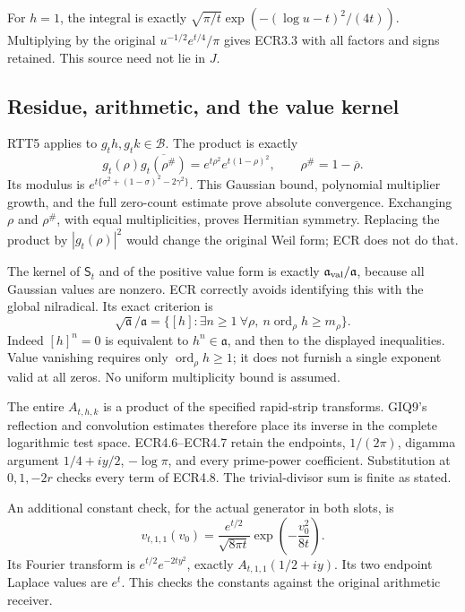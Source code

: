 For \(h=1\), the integral is exactly
\(\sqrt{\pi/t}\exp(-(\log u-t)^2/(4t))\). Multiplying by the original
\(u^{-1/2}e^{t/4}/\pi\) gives ECR3.3 with all factors and signs
retained. This source need not lie in \(J\).

\subsection{Residue, arithmetic, and the value
kernel}\label{residue-arithmetic-and-the-value-kernel}

RTT5 applies to \(g_th,g_tk\in\mathcal B\). The product is exactly \[
g_t(\rho)\overline{g_t(\rho^\#)}
=e^{t\rho^2}e^{t(1-\rho)^2},
\qquad \rho^\#=1-\overline\rho.
\tag{ECRA3}
\] Its modulus is \(e^{t\{\sigma^2+(1-\sigma)^2-2\gamma^2\}}\). This
Gaussian bound, polynomial multiplier growth, and the full zero-count
estimate prove absolute convergence. Exchanging \(\rho\) and
\(\rho^\#\), with equal multiplicities, proves Hermitian symmetry.
Replacing the product by \(|g_t(\rho)|^2\) would change the original
Weil form; ECR does not do that.

The kernel of \(\mathsf S_t\) and of the positive value form is exactly
\(\mathfrak a_{\rm val}/\mathfrak a\), because all Gaussian values are
nonzero. ECR correctly avoids identifying this with the global
nilradical. Its exact criterion is \[
\sqrt{\mathfrak a}/\mathfrak a
=\{[h]:\exists n\ge1\ \forall\rho,\
 n\operatorname{ord}_{\rho}h\ge m_\rho\}.
\tag{ECRA4}
\] Indeed \([h]^n=0\) is equivalent to \(h^n\in\mathfrak a\), and then
to the displayed inequalities. Value vanishing requires only
\(\operatorname{ord}_{\rho}h\ge1\); it does not furnish a single
exponent valid at all zeros. No uniform multiplicity bound is assumed.

The entire \(A_{t,h,k}\) is a product of the specified rapid-strip
transforms. GIQ9's reflection and convolution estimates therefore place
its inverse in the complete logarithmic test space. ECR4.6--ECR4.7
retain the endpoints, \(1/(2\pi)\), digamma argument \(1/4+iy/2\),
\(-\log\pi\), and every prime-power coefficient. Substitution at
\(0,1,-2r\) checks every term of ECR4.8. The trivial-divisor sum is
finite as stated.

An additional constant check, for the actual generator in both slots, is
\[
v_{t,1,1}(v_0)=
\frac{e^{t/2}}{\sqrt{8\pi t}}
\exp\!\left(-\frac{v_0^2}{8t}\right).
\tag{ECRA5}
\] Its Fourier transform is \(e^{t/2}e^{-2ty^2}\), exactly
\(A_{t,1,1}(1/2+iy)\). Its two endpoint Laplace values are \(e^t\). This
checks the constants against the original arithmetic receiver.

